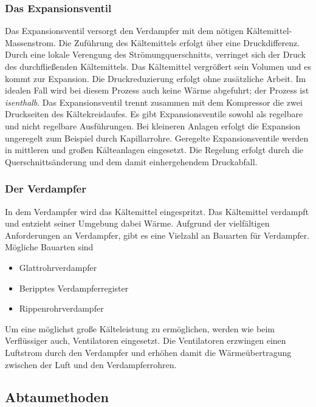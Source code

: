 \subsubsection*{Das Expansionsventil}

Das Expansionsventil versorgt den Verdampfer mit dem nötigen Kältemittel-Massenstrom. Die Zuführung des Kältemittels erfolgt über eine Druckdifferenz. Durch eine lokale Verengung des Strömungquerschnitts, verringet sich der Druck des durchfließenden Kältemittels. Das Kältemittel vergrößert sein Volumen und es kommt zur Expansion. Die Druckreduzierung erfolgt ohne zusätzliche Arbeit. Im idealen Fall wird bei diesem Prozess auch keine Wärme abgefuhrt; der Prozess ist \textit{isenthalb}. 
Das Expansionsventil trennt zusammen mit dem Kompressor die zwei Druckseiten des Kältekreislaufes. Es gibt Expansionsventile sowohl als regelbare und nicht regelbare Ausführungen. Bei kleineren Anlagen erfolgt die Expansion ungeregelt zum Beispiel durch Kapillarrohre. Geregelte Expansionsventile werden in mittleren und großen Kälteanlagen eingesetzt. Die Regelung erfolgt durch die Querschnittsänderung und dem damit einhergehendem Druckabfall.  

\subsubsection*{Der Verdampfer}

In dem Verdampfer wird das Kältemittel eingespritzt. Das Kältemittel verdampft und entzieht seiner Umgebung dabei Wärme. Aufgrund der vielfältigen Anforderungen an Verdampfer, gibt es eine Vielzahl an Bauarten für Verdampfer. Mögliche Bauarten sind 

\begin{itemize}
\item Glattrohrverdampfer
\item Beripptes Verdampferregister
\item Rippenrohrverdampfer
\end{itemize}

Um eine möglichst große Kälteleistung zu ermöglichen, werden wie beim Verflüssiger auch, Ventilatoren eingesetzt. Die Ventilatoren erzwingen einen Luftstrom durch den Verdampfer und erhöhen damit die Wärmeübertragung zwischen der Luft und den Verdampferrohren. 

\subsection{Abtaumethoden}
\label{subsec: Abtaumethoden}

